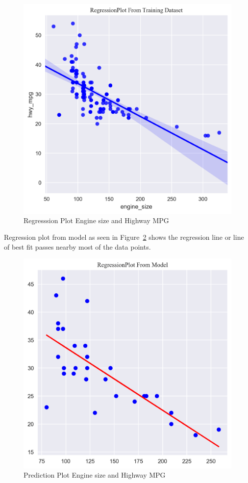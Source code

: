  \begin{figure}[!h]
  \includegraphics[width=\columnwidth]{images/reg_plot.png}
  \caption{Regresssion Plot Engine size and Highway MPG}
\label{fig:regplt}
\end{figure}
 
 
 Regression plot from model as seen in Figure~\ref{fig:predplt} shows 
 the regression line or line of best fit passes nearby most of the data
 points. 
 
 \begin{figure}[htb]
  \includegraphics[width=\columnwidth]{images/plot_pred_test_set.png}
  \caption{Prediction Plot Engine size and Highway MPG}
  \label{fig:predplt}
\end{figure}
 
